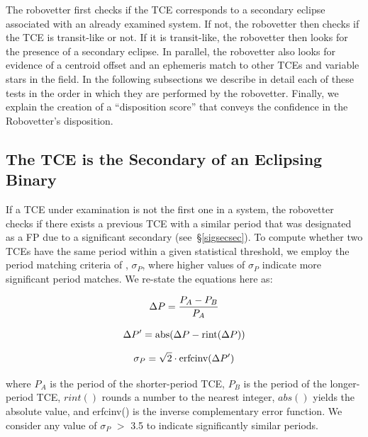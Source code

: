 The robovetter first checks if the TCE corresponds to a secondary eclipse associated with an already examined system. If not, the robovetter then checks if the TCE is transit-like or not. If it is transit-like, the robovetter then looks for the presence of a secondary eclipse. In parallel, the robovetter also looks for evidence of a centroid offset and an ephemeris match to other TCEs and variable stars in the \kepler{} field. In the following subsections we describe in detail each of these tests in the order in which they are performed by the robovetter. Finally, we explain the creation of a ``disposition score'' that conveys the confidence in the Robovetter's disposition.


\subsection{The TCE is the Secondary of an Eclipsing Binary}

If a TCE under examination is not the first one in a system, the robovetter checks if there exists a previous TCE with a similar period that was designated as a FP due to a significant secondary (see~\S\ref{sigsecsec}). To compute whether two TCEs have the same period within a given statistical threshold, we employ the period matching criteria of \citet[][see equations 1-3]{Coughlin2014a}, $\sigma_{P}$, where higher values of $\sigma_{P}$ indicate more significant period matches. We re-state the equations here as:

\begin{equation}
\label{peq1}
\Delta P = \frac{P_{A}-P_{B}}{P_{A}}\\
\end{equation}

\begin{equation}
\label{peq2}
\Delta P^{\prime} = \textrm{abs}(\Delta P - \textrm{rint}(\Delta P))\\
\end{equation}

\begin{equation}
\label{peq3}
\sigma_{P} = \sqrt{2}\cdot\textrm{erfcinv}(\Delta P^{\prime})\\
\end{equation}

\noindent where $P_{A}$ is the period of the shorter-period TCE, $P_{B}$ is the period of the longer-period TCE, $rint()$ rounds a number to the nearest integer, $abs()$ yields the absolute value, and erfcinv() is the inverse complementary error function. We consider any value of $\sigma_{P}$ $>$ 3.5 to indicate significantly similar periods.

